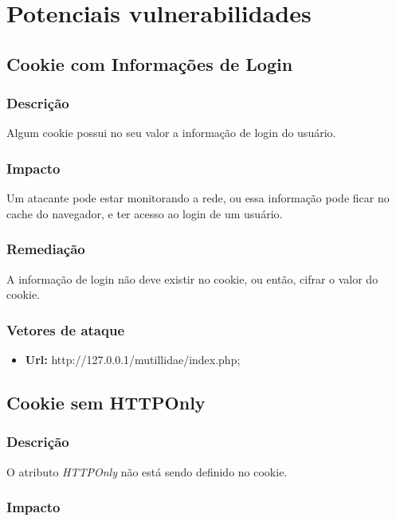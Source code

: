 \documentclass{ufscThesis}
\newcommand{\+}{\discretionary{\mbox{${\bm\cdot}\mkern-1mu$}}{}{}}
\renewcommand\+{\discretionary{}{}{}}
\begin{document}
\chapter{Potenciais vulnerabilidades}

\section{Cookie com Informações de Login}

\subsection{Descrição}

Algum cookie possui no seu valor a informação de login do usuário.

\subsection{Impacto}

Um atacante pode estar monitorando a rede, ou essa informação pode ficar no cache do navegador, e ter acesso ao login de um usuário.

\subsection{Remediação}

A informação de login não deve existir no cookie, ou então, cifrar o valor do cookie.

\subsection{Vetores de ataque}

\begin{itemize}
\item \textbf{Url:} http://127.0.0.1/mutillidae/index.php;
\end{itemize}
\section{Cookie sem HTTPOnly}

\subsection{Descrição}

O atributo \emph{HTTPOnly} não está sendo definido no cookie.

\subsection{Impacto}
\end{document}
